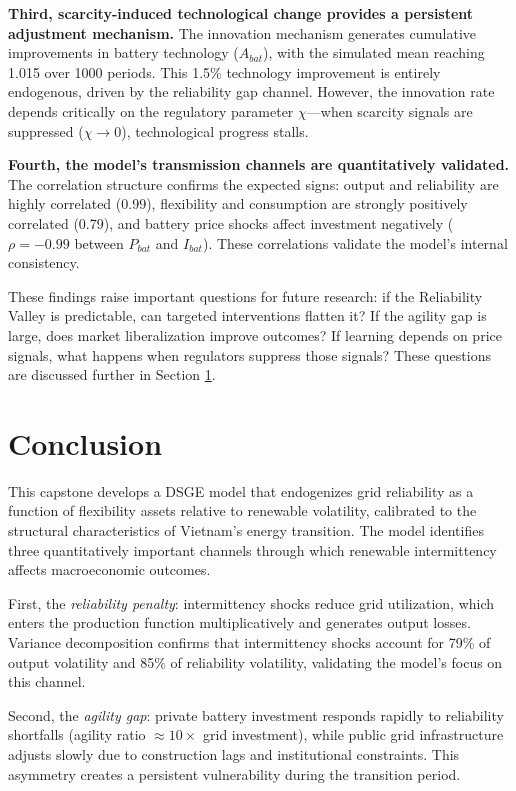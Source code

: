 \documentclass[12pt, a4paper]{article}
\begin{document}
\textbf{Third, scarcity-induced technological change provides a persistent adjustment mechanism.} The innovation mechanism generates cumulative improvements in battery technology ($A_{bat}$), with the simulated mean reaching 1.015 over 1000 periods. This 1.5\% technology improvement is entirely endogenous, driven by the reliability gap channel. However, the innovation rate depends critically on the regulatory parameter $\chi$---when scarcity signals are suppressed ($\chi \to 0$), technological progress stalls.

\textbf{Fourth, the model's transmission channels are quantitatively validated.} The correlation structure confirms the expected signs: output and reliability are highly correlated (0.99), flexibility and consumption are strongly positively correlated (0.79), and battery price shocks affect investment negatively ($\rho = -0.99$ between $P_{bat}$ and $I_{bat}$). These correlations validate the model's internal consistency.

These findings raise important questions for future research: if the Reliability Valley is predictable, can targeted interventions flatten it? If the agility gap is large, does market liberalization improve outcomes? If learning depends on price signals, what happens when regulators suppress those signals? These questions are discussed further in Section \ref{sec:conclusion}.

\section{Conclusion} \label{sec:conclusion}

This capstone develops a DSGE model that endogenizes grid reliability as a function of flexibility assets relative to renewable volatility, calibrated to the structural characteristics of Vietnam's energy transition. The model identifies three quantitatively important channels through which renewable intermittency affects macroeconomic outcomes.

First, the \textit{reliability penalty}: intermittency shocks reduce grid utilization, which enters the production function multiplicatively and generates output losses. Variance decomposition confirms that intermittency shocks account for 79\% of output volatility and 85\% of reliability volatility, validating the model's focus on this channel.

Second, the \textit{agility gap}: private battery investment responds rapidly to reliability shortfalls (agility ratio $\approx 10\times$ grid investment), while public grid infrastructure adjusts slowly due to construction lags and institutional constraints. This asymmetry creates a persistent vulnerability during the transition period.
\end{document}
